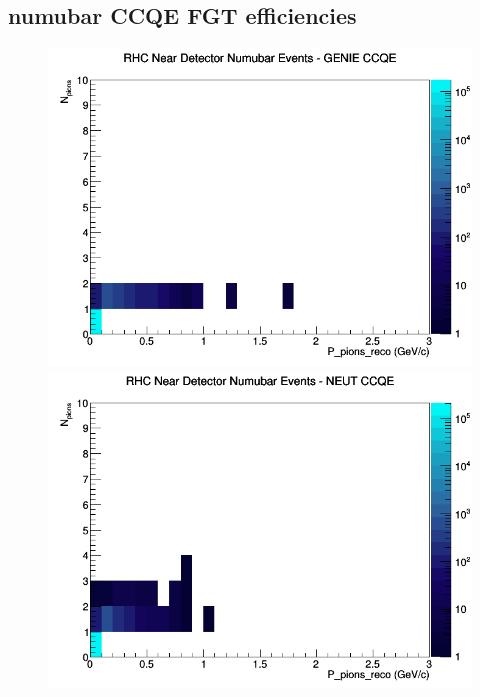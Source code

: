 \documentclass[12pt]{article}
\begin{document}
\subsection{numubar CCQE FGT efficiencies}
\begin{figure}[h]
\includegraphics[width=\linewidth]{eff_N_P/FGT/pions/CCQE_RHC_ND_numubar_N_P_GENIE.png}
\endminipage
{}
\includegraphics[width=\linewidth]{eff_N_P/FGT/pions/CCQE_RHC_ND_numubar_N_P_NEUT.png}
\endminipage
{}

\end{figure}
\end{document}
